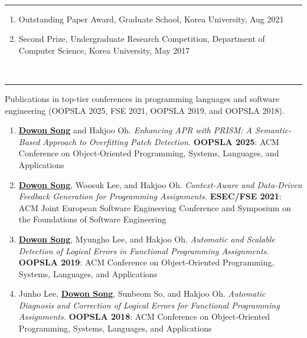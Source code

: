 \documentclass[letterpaper,11pt,oneside]{article}
\begin{document}
\vspace{1.6em}
\\[-0.5em]
\rule{\textwidth}{0.4pt}
\begin{enumerate}
  \item Outstanding Paper Award, Graduate School, Korea University, Aug 2021
  \item Second Prize, Undergraduate Research Competition, 
        Department of Computer Science, Korea University, May 2017
\end{enumerate}

\vspace{1.6em}
\\[-0.5em]
\rule{\textwidth}{0.4pt}
Publications in top-tier conferences in programming languages and software engineering (OOPSLA 2025, FSE 2021, OOPSLA 2019, and OOPSLA 2018).
\begin{enumerate}    
    \item{\underline {\textbf{Dowon Song}} and 
      Hakjoo Oh. 
      \textsl{Enhancing APR with PRISM: A Semantic-Based Approach to Overfitting Patch Detection.} 
      \textbf{OOPSLA 2025}: ACM Conference on Object-Oriented Programming, Systems, Languages, and Applications}\\
    \item{\underline {\textbf{Dowon Song}}, Woosuk Lee, and 
      Hakjoo Oh. \textsl{Context-Aware and Data-Driven Feedback Generation for Programming Assignments.} \textbf{ESEC/FSE 2021}: ACM Joint European Software Engineering Conference and Symposium on the Foundations of Software Engineering}\\
    \item{\underline {\textbf{Dowon Song}}, Myungho Lee, and 
      Hakjoo Oh. \textsl{Automatic and Scalable Detection of Logical Errors in Functional Programming Assignments.} \textbf{OOPSLA 2019}: ACM Conference on Object-Oriented Programming, Systems, Languages, and Applications}\\
    \item{Junho Lee, \underline{\textbf{Dowon Song}}, Sunbeom So, and
      Hakjoo Oh. \textsl{Automatic Diagnosis and Correction of Logical Errors for Functional Programming Assignments.} \textbf{OOPSLA 2018}: ACM Conference on Object-Oriented Programming, Systems, Languages, and Applications}\\
\end{enumerate}
\end{document}
